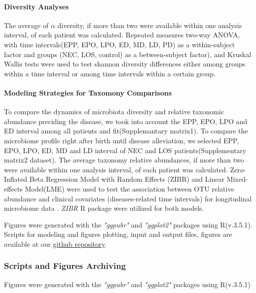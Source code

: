 \documentclass[fleqn,10pt,lineno]{wlpeerj} %
\begin{document}
      \paragraph{Diversity Analyses}
      The average of $\alpha$ diversity, if more than two were available within one analysis interval, of each patient was calculated. Repeated measures two-way ANOVA, with time intervals(EPP, EPO, LPO, ED, MD, LD, PD) as a within-subject factor and groups (NEC, LOS, control) as a between-subject factor), and Kruskal Wallis tests were used to test shannon diversity differences either among groups within a time interval or among time intervals within a certain group.
      \paragraph*{Modeling Strategies for Taxomony Comparisons}
      To compare the dynamics of microbiota diversity and relative taxonomic abundance preciding the disease, we took into account the EPP, EPO, LPO and ED interval among all patients and fit(Supplemantary matrix1).
      To compare the microbiome profile right after birth until disease alleviation, we selected EPP, EPO, LPO, ED, MD and LD interval of NEC and LOS patients(Supplementary matrix2 dataset).
      The average taxonomy relative abundances, if more than two were available within one analysis interval, of each patient was calculated.
      Zero-Inflated Beta Regression Model with Random Effects (ZIBR) and Linear Mixed-effects Model(LME) were used to test the association between OTU relative abundance and clinical covariates (diseases-related time intervals) for longitudinal microbiome data \citep{chen2016two}. \textit{ZIBR} R package were utilized for both models.

      \noindent
      Figures were generated with the \textit{"ggpubr"}\citep{kassambara2017ggpubr} and \textit{"ggplot2"}\citep{ggplot2} packages using R(v.3.5.1).
      Scripts for modeling and figures plotting, input and output files, figures are available at our \href{https://github.com/jiayiliujiayi/NEC-LOS-microbiota_pattern_comparison}{github repository}.

    \subsubsection*{Scripts and Figures Archiving}
    Figures were generated with the \textit{"ggpubr"}\citep{kassambara2017ggpubr} and \textit{"ggplot2"}\citep{ggplot2} packages using R(v.3.5.1)
\end{document}
